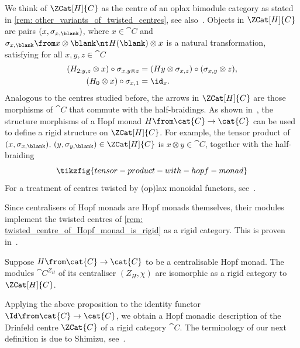 \begin{remark}\label{rem: twisted_centre_of_Hopf_monad_is_rigid}
  We think of \(\ZCat[H]{C}\) as the centre of an oplax bimodule category as stated
  in \cref{rem: other_variants_of_twisted_centres},
  see also~\cite[Section 5.5]{Bruguieres2007}.
  Objects in \(\ZCat[H]{C}\) are pairs \((x, \sigma_{x, \blank})\),
  where \(x \in \cat{C}\) and \(\sigma_{x,\blank} \from x \otimes \blank \nt H(\blank) \otimes x\)
  is a natural transformation, satisfying for all \(x,y,z \in \cat{C}\)
  \begin{align*}
    (H_{2;y,z} \otimes x) \circ \sigma_{x, y \otimes z} &= (Hy \otimes \sigma_{x,z}) \circ (\sigma_{x,y} \otimes z), \\
    (H_0 \otimes x) \circ \sigma_{x,1} &= \id_{x}.
  \end{align*}
  Analogous to the centres studied before,
  the arrows in \(\ZCat[H]{C}\) are those morphisms of \(\cat{C}\)
  that commute with the half-braidings.
  As shown in~\cite[Proposition~5.9]{Bruguieres2012},
  the structure morphisms of a Hopf monad \(H \from \cat{C} \to \cat{C}\)
  can be used to define a rigid structure on \(\ZCat[H]{C}\).
  For example, the tensor product of
  \((x, \sigma_{x,\blank}),\, (y, \sigma_{y,\blank}) \in \ZCat[H]{C}\) is \(x\otimes y \in \cat{C}\),
  together with the half-braiding
  \[
    \tikzfig{tensor-product-with-hopf-monad}
  \]
  For a treatment of centres twisted by (op)lax monoidal functors,
  see~\cite{femić23:categ-yetter}.
\end{remark}

Since centralisers of Hopf monads are Hopf monads themselves,
their modules implement the twisted centres
of \cref{rem: twisted_centre_of_Hopf_monad_is_rigid} as a rigid category.
This is proven in~\cite[Theorem~5.12 and Corollary~5.14]{Bruguieres2012}.

\begin{proposition}\label{prop: central_bimonad_Drinfeld_centre}
  Suppose \(H \from \cat{C} \to \cat{C}\) to be a centralisable Hopf monad.
  The modules \(\cat{C}^{Z_H}\) of its centraliser \((Z_H, \chi)\)
  are isomorphic as a rigid category to \(\ZCat[H]{C}\).
\end{proposition}

Applying the above proposition to the identity functor \(\Id \from \cat{C} \to \cat{C}\),
we obtain a Hopf monadic description of the Drinfeld centre \(\ZCat{C}\) of a rigid category \(\cat{C}\).
The terminology of our next definition is due to Shimizu, see~\cite{Shimizu2017}.

